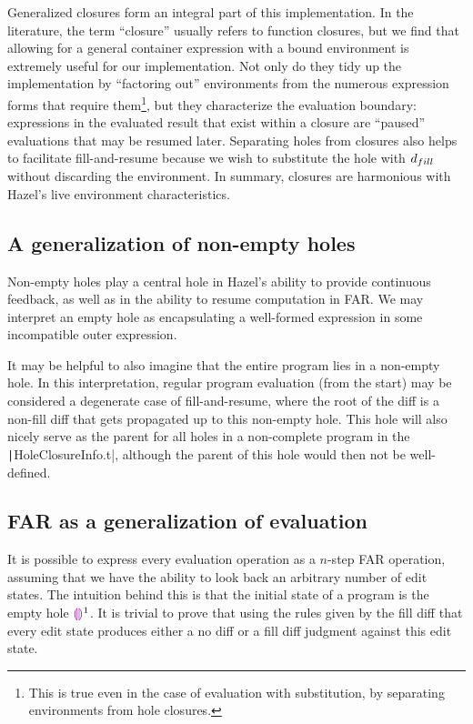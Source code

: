Generalized closures form an integral part of this implementation. In the literature, the term ``closure'' usually refers to function closures, but we find that allowing for a general container expression with a bound environment is extremely useful for our implementation. Not only do they tidy up the implementation by ``factoring out'' environments from the numerous expression forms that require them\footnote{This is true even in the case of evaluation with substitution, by separating environments from hole closures.}, but they characterize the evaluation boundary: expressions in the evaluated result that exist within a closure are ``paused'' evaluations that may be resumed later. Separating holes from closures also helps to facilitate fill-and-resume because we wish to substitute the hole with $d_{fill}$ without discarding the environment. In summary, closures are harmonious with Hazel's live environment characteristics.

\subsection{A generalization of non-empty holes}
\label{sec:generalized-neholes}

Non-empty holes play a central hole in Hazel's ability to provide continuous feedback, as well as in the ability to resume computation in FAR. We may interpret an empty hole as encapsulating a well-formed expression in some incompatible outer expression.

It may be helpful to also imagine that the entire program lies in a non-empty hole. In this interpretation, regular program evaluation (from the start) may be considered a degenerate case of fill-and-resume, where the root of the diff is a non-fill diff that gets propagated up to this non-empty hole. This hole will also nicely serve as the parent for all holes in a non-complete program in the \texttt|HoleClosureInfo.t|, although the parent of this hole would then not be well-defined.

\subsection{FAR as a generalization of evaluation}
\label{sec:generalized-far}

It is possible to express every evaluation operation as a $n$-step FAR operation, assuming that we have the ability to look back an arbitrary number of edit states. The intuition behind this is that the initial state of a program is the empty hole $\textcolor{violet}{\llparenthesis}\textcolor{violet}{\rrparenthesis}^1$. It is trivial to prove that using the rules given by the fill diff that every edit state produces either a no diff or a fill diff judgment against this edit state.

